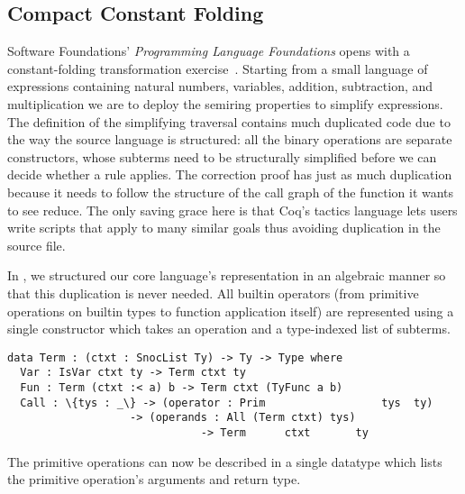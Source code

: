 \subsection{Compact Constant Folding}
\label{sec:design:constants}

Software Foundations' \emph{Programming Language Foundations} opens with a constant-folding transformation exercise~\cite[Chapter~1]{Pierce:SF2}.
%
Starting from a small language of expressions containing natural numbers, variables, addition, subtraction, and multiplication we are to deploy the semiring properties to simplify expressions.
%
The definition of the simplifying traversal contains much duplicated code due to the way the source language is structured:
%
all the binary operations are separate constructors, whose subterms need to be structurally simplified before we can decide whether a rule applies.
%
The correction proof has just as much duplication because it needs to follow the structure of the call graph of the function it wants to see reduce.
%
The only saving grace here is that Coq's tactics language lets users write scripts that apply to many similar goals thus avoiding duplication in the source file.

In \Velo{}, we structured our core language's representation in an algebraic
manner so that this duplication is never needed.
%
All builtin operators (from primitive operations on builtin types to function
application itself) are represented using a single  constructor
which takes an operation and a type-indexed list of subterms.

\begin{Verbatim}
data Term : (ctxt : SnocList Ty) -> Ty -> Type where
  Var : IsVar ctxt ty -> Term ctxt ty
  Fun : Term (ctxt :< a) b -> Term ctxt (TyFunc a b)
  Call : \{tys : _\} -> (operator : Prim                  tys  ty)
                   -> (operands : All (Term ctxt) tys)
                              -> Term      ctxt       ty
\end{Verbatim}


The primitive operations can now be described in a single datatype  which lists the primitive operation's arguments and return type.
\begin{comment}
\IdrisData{Zero}---which takes no argument and returns a term of type \IdrisData{TyNat};
%
\IdrisData{And}---which takes two arguments of type \IdrisData{TyBool} and return a term
of type \IdrisData{TyBool};
%
and
%
\IdrisData{App}---which takes a function and an argument that corresponds to the type of the function's domain and returns a term that is the type of the function's co-domain.
\end{comment}

